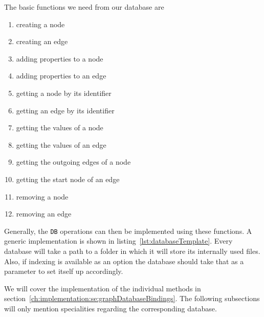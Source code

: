 The basic functions we need from our database are

\begin{enumerate}
  \item creating a node
  \item creating an edge
  \item adding properties to a node
  \item adding properties to an edge
  \item getting a node by its identifier
  \item getting an edge by its identifier
  \item getting the values of a node
  \item getting the values of an edge
  \item getting the outgoing edges of a node
  \item getting the start node of an edge
  \item removing a node
  \item removing an edge
\end{enumerate}

Generally,
the \texttt{DB} operations can then be implemented using these functions.
A generic implementation is shown in listing~\ref{lst:databaseTemplate}.
Every database will take a path to a folder in which it will store its internally used files.
Also,
if indexing is available as an option the database should take that as a parameter to set itself up accordingly.

We will cover the implementation of the individual methods in section~\ref{ch:implementation:se:graphDatabaseBindings}.
The following subsections will only mention specialities regarding the corresponding database.

